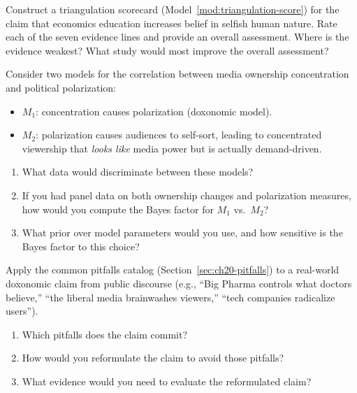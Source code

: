 \begin{exercise}
Construct a triangulation scorecard (Model~\ref{mod:triangulation-score}) for the claim that economics education increases belief in selfish human nature.
Rate each of the seven evidence lines and provide an overall assessment.
Where is the evidence weakest?
What study would most improve the overall assessment?
\end{exercise}

\begin{exercise}
\label{ex:bayes-factor-exercise}
Consider two models for the correlation between media ownership concentration and political polarization:
\begin{itemize}[nosep]
  \item $M_1$: concentration causes polarization (doxonomic model).
  \item $M_2$: polarization causes audiences to self-sort, leading to concentrated viewership that \emph{looks like} media power but is actually demand-driven.
\end{itemize}
\begin{enumerate}[nosep]
  \item What data would discriminate between these models?
  \item If you had panel data on both ownership changes and polarization measures, how would you compute the Bayes factor for $M_1$ vs.\ $M_2$?
  \item What prior over model parameters would you use, and how sensitive is the Bayes factor to this choice?
\end{enumerate}
\end{exercise}

\begin{exercise}
Apply the common pitfalls catalog (Section~\ref{sec:ch20-pitfalls}) to a real-world doxonomic claim from public discourse (e.g., ``Big Pharma controls what doctors believe,'' ``the liberal media brainwashes viewers,'' ``tech companies radicalize users'').
\begin{enumerate}[nosep]
  \item Which pitfalls does the claim commit?
  \item How would you reformulate the claim to avoid those pitfalls?
  \item What evidence would you need to evaluate the reformulated claim?
\end{enumerate}
\end{exercise}

